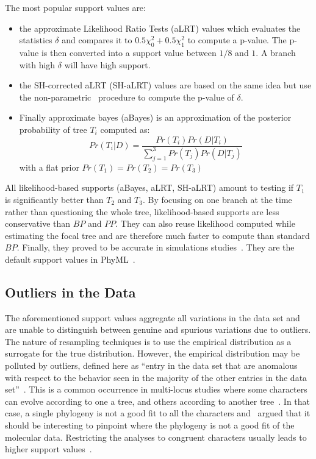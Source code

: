 The most popular support values are:
\begin{itemize}
 \item the approximate Likelihood Ratio Tests (aLRT) values which evaluates the statistics $\delta$ and compares it to $0.5\chi^2_0 + 0.5\chi^2_1$ to compute a p-value. The p-value is then converted into a support value between $1/8$ and $1$. A branch with high $\delta$ will have high support. 
 \item the SH-corrected aLRT (SH-aLRT) values are based on the same idea but use the non-parametric~\citet{Shimodaira1999} procedure to compute the p-value of $\delta$.
 \item Finally approximate bayes (aBayes) is an approximation of the posterior probability of tree $T_i$ computed as:
 \[
  Pr(T_i | D) = \frac{Pr(T_i) Pr(D | T_i)}{\sum_{j=1}^3 Pr(T_j) Pr(D | T_j)}
 \]
 with a flat prior $Pr(T_1) = Pr(T_2)= Pr(T_3)$
\end{itemize}

All likelihood-based supports (aBayes, aLRT, SH-aLRT) amount to testing if $T_1$ is significantly better than $T_2$ and $T_3$. By focusing on one branch at the time rather than questioning the whole tree, likelihood-based supports are less conservative than $BP$ and $PP$. They can also reuse likelihood computed while estimating the focal tree and are therefore much faster to compute than standard $BP$. Finally, they proved to be accurate in simulations studies~\citep{Anisimova2011}. They are the default support values in PhyML~\citep{Guindon2003}. 

\subsection{Outliers in the Data} \label{sec:outliers}

The aforementioned support values aggregate all variations in the data set and are unable to distinguish between genuine and spurious variations due to outliers. The nature of resampling techniques is to use the empirical distribution as a surrogate for the true distribution. However, the empirical distribution may be polluted by outliers, defined here as ``entry in the data set that are anomalous with respect to
the behavior seen in the majority of the other entries in the data set''~\citep{Barnett1994}. This is a common occurrence in multi-locus studies where some characters can evolve according to one a tree, and others according to another tree~\cite{Degnan2009}. In that case, a single phylogeny is not a good fit to all the characters and~\citet{Swofford1996} argued that it should be interesting to pinpoint where the phylogeny is not a good fit of the molecular data. Restricting the analyses to congruent characters usually leads to higher support values~\citep{Bar-Hen2008}.

